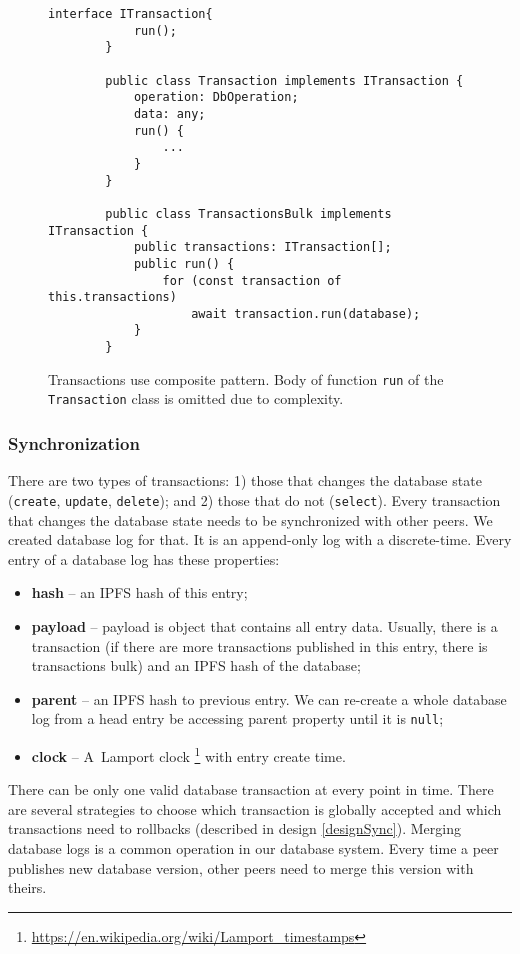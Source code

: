 \begin{figure}[h]
    \centering
    \begin{lstlisting}[style=ES6]
        interface ITransaction{
            run();
        }
        
        public class Transaction implements ITransaction {
            operation: DbOperation;
            data: any;
            run() {
                ...
            }
        }
        
        public class TransactionsBulk implements ITransaction {
            public transactions: ITransaction[];
            public run() {
                for (const transaction of this.transactions)
                    await transaction.run(database);
            }
        }
    \end{lstlisting}
    \caption{Transactions use composite pattern. Body of function \texttt{run} of the \texttt{Transaction} class is omitted due to complexity.}
    \label{transactionsComposite}
\end{figure}


\subsubsection{Synchronization}
There are two types of transactions: 1) those that changes the database state (\texttt{create}, \texttt{update}, \texttt{delete}); and 2) those that do not (\texttt{select}). Every transaction that changes the database state needs to be synchronized with other peers. We created database log for that. It is an append-only log with a discrete-time. Every entry of a database log has these properties:
\begin{itemize}
    \item \textbf{hash} -- an IPFS hash of this entry;
    \item \textbf{payload} -- payload is object that contains all entry data. Usually, there is a transaction (if there are more transactions published in this entry, there is transactions bulk) and an IPFS hash of the database;
    \item \textbf{parent} -- an IPFS hash to previous entry. We can re-create a whole database log from a head entry be accessing parent property until it is \texttt{null};
    \item \textbf{clock} -- A~Lamport clock \footnote{\url{https://en.wikipedia.org/wiki/Lamport_timestamps}} with entry create time.
\end{itemize}
There can be only one valid database transaction at every point in time. There are several strategies to choose which transaction is globally accepted and which transactions need to rollbacks (described in design \ref{designSync}). Merging database logs is a common operation in our database system. Every time a peer publishes new database version, other peers need to merge this version with theirs.

